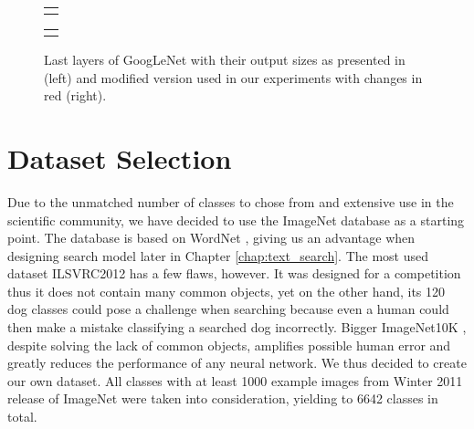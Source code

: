 \begin{figure}
	\centering
	
	\begin{tabular}{@{}c@{}}
		\subfloat{
			
		}
	\end{tabular}
	\begin{tabular}{@{}c@{}}
		\subfloat{
			
		}
	\end{tabular}
	
	\caption[Last layers of GoogLeNet]{Last layers of GoogLeNet with their output sizes as presented in \cite{szegedy2015going} (left) and modified version used in our experiments with changes in red (right).}
	\label{fig:inception_end}
\end{figure}



\section{Dataset Selection}
Due to the unmatched number of classes to chose from and extensive use in the scientific community, we have decided to use the ImageNet database \cite{ILSVRC15} as a starting point. The database is based on WordNet \cite{WordNet}, giving us an advantage when designing search model later in Chapter \ref{chap:text_search}. The most used dataset ILSVRC2012 has a few flaws, however. It was designed for a competition thus it does not contain many common objects, yet on the other hand, its 120 dog classes could pose a challenge when searching because even a human could then make a mistake classifying a searched dog incorrectly. Bigger ImageNet10K \cite{deng2010does}, despite solving the lack of common objects, amplifies possible human error and greatly reduces the performance of any neural network. We thus decided to create our own dataset. All classes with at least 1000 example images from Winter 2011 release of ImageNet were taken into consideration, yielding to 6642 classes in total.

